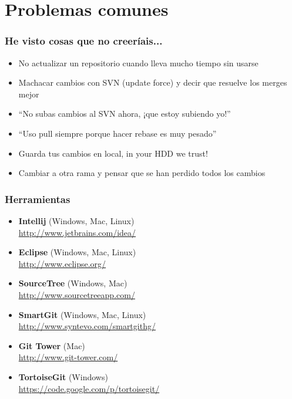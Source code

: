 \section{Problemas comunes}
\frame
{
\frametitle{He visto cosas que no creeríais...}
\begin{itemize}
\item No actualizar un repositorio cuando lleva mucho tiempo sin usarse
\item Machacar cambios con SVN (update force) y decir que resuelve los merges mejor
\item ``No subas cambios al SVN ahora, ¡que estoy subiendo yo!''
\item ``Uso pull siempre porque hacer rebase es muy pesado''
\item Guarda tus cambios en local, in your HDD we trust!
\item Cambiar a otra rama y pensar que se han perdido todos los cambios
\end{itemize}
}

\usebackgroundtemplate{}
\frame
{
\frametitle{Herramientas}
\begin{itemize}
 \item \textbf{Intellij} (Windows, Mac, Linux)\\ \url{http://www.jetbrains.com/idea/}
 \item \textbf{Eclipse} (Windows, Mac, Linux)\\ \url{http://www.eclipse.org/}
 \item \textbf{SourceTree} (Windows, Mac)\\ \url{http://www.sourcetreeapp.com/}
 \item \textbf{SmartGit} (Windows, Mac, Linux)\\ \url{http://www.syntevo.com/smartgithg/}
 \item \textbf{Git Tower} (Mac)\\ \url{http://www.git-tower.com/}
 \item \textbf{TortoiseGit} (Windows)\\ \url{https://code.google.com/p/tortoisegit/}
\end{itemize}
}